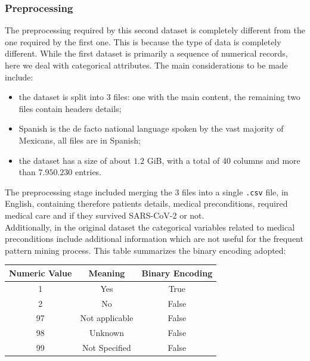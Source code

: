 \documentclass[11pt,a4paper]{article}
\begin{document}
\subsubsection{Preprocessing}
The preprocessing required by this second dataset is completely different from
the one required  by the first one. This is because the type of data is
completely different. While the first dataset is primarily a sequence of
numerical records, here we deal with categorical attributes. The main
considerations to be made include:
\begin{itemize}
    \item the dataset is split into $3$ files: one with the main content, the
    remaining two files contain headers details;
    \item Spanish is the de facto national language spoken by the vast majority
    of Mexicans, all files are in Spanish;
    \item the dataset has a size of about $1.2$ GiB, with a total of 40 columns
    and more than $7.950.230$ entries.
\end{itemize}
The preprocessing stage included merging the 3 files into a single \texttt{.csv}
file, in English, containing therefore patients details, medical preconditions,
required medical care and if they survived SARS-CoV-2 or not.\\
Additionally, in the original dataset the categorical variables related to
medical preconditions include additional information which are not useful for
the frequent pattern mining process. This table summarizes the binary encoding
adopted:
\begin{center}
\begin{tabular}{ |c|c|c| }
\hline
\textbf{Numeric Value} & \textbf{Meaning} & \textbf{Binary Encoding} \\
\hline
1 & Yes & True \\
\hline
2 & No & False \\
\hline
97 & Not applicable & False \\
\hline
98 & Unknown & False \\
\hline
99 & Not Specified & False \\
\hline
\end{tabular}
\end{center}

\newpage
\end{document}
